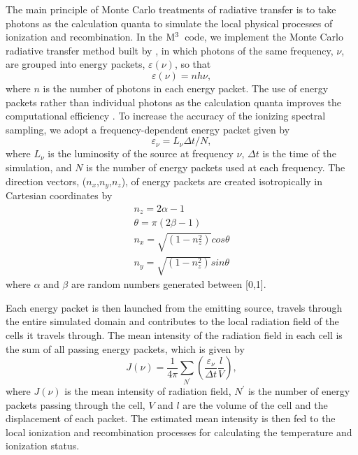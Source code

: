 \documentclass[twocolumn]{aastex62}
\newcommand{\newcode}{{$\rm M^3$}}
\begin{document}
\begin{CJK*}{UTF8}{gbsn}
The main principle of Monte Carlo treatments of radiative transfer is to take photons as the calculation quanta to simulate the local physical processes of ionization and recombination. 
In the \newcode\ code, we implement the Monte Carlo radiative transfer method built by \cite{Lucy-1999}, in which photons of the same frequency, $\nu$, are grouped into energy packets, $\varepsilon (\nu)$, so that
\begin{equation}\label{eq1}
 \varepsilon (\nu)=nh\nu,
\end{equation}
where $n$ is the number of photons in each energy packet.
The use of energy packets rather than individual photons as the calculation quanta improves the computational efficiency \citep{Och-1998,Lucy-1999}. 
To increase the accuracy of the ionizing spectral sampling, we adopt a frequency-dependent energy packet given by
\begin{equation}\label{eq1.1} 
 \varepsilon_{\nu}=L_{\nu}\Delta t/N , 
\end{equation}
where $L_{\nu}$ is the luminosity of the source at frequency $\nu$, $\Delta t$ is the time of the simulation, and $N$ is the number of energy packets used at each frequency. 
The direction vectors, ($n_x$,$n_y$,$n_z$), of energy packets are created isotropically in Cartesian coordinates by
\begin{equation}\label{eq2}
\begin{split}
n_z=2\alpha-1\\
\theta=\pi(2\beta-1)\\
n_x=\sqrt{(1-n^2_z)}cos\theta\\
n_y=\sqrt{(1-n^2_z)}sin\theta
\end{split}
\end{equation}
where $\alpha$ and $\beta$ are random numbers generated between [0,1]. 

Each energy packet is then launched from the emitting source, travels through the entire simulated domain and contributes to the local radiation field of the cells it travels through.
The mean intensity of the radiation field in each cell is the sum of all passing energy packets, which is given by 
\begin{equation}\label{eq6}
 J(\nu)=\frac{1}{4\pi}\sum_{N^{\prime}}\left(\frac{\varepsilon_{\nu}}{\Delta t}\frac{l}{V}\right),
\end{equation}
where $J(\nu)$ is the mean intensity of radiation field, $N^{\prime}$ is the number of energy packets passing through the cell, $V$ and $l$ are the volume of the cell and the displacement of each packet. 
The estimated mean intensity is then fed to the local ionization and recombination processes for calculating the temperature and ionization status.




\end{CJK*}
\end{document}
